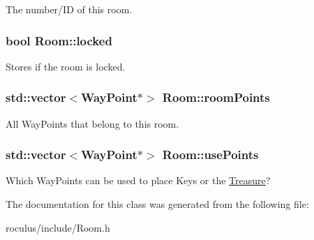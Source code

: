\-The number/\-I\-D of this room. \hypertarget{classRoom_a7d1c69d12f2fe191ad142be4fec461d4}{
\subsubsection[{locked}]{\setlength{\rightskip}{0pt plus 5cm}bool {\bf \-Room\-::locked}}}\label{classRoom_a7d1c69d12f2fe191ad142be4fec461d4}
\-Stores if the room is locked. \hypertarget{classRoom_a672a853c876de647aec33a2ad4da0471}{
\subsubsection[{room\-Points}]{\setlength{\rightskip}{0pt plus 5cm}std\-::vector$<${\bf \-Way\-Point}$\ast$$>$ {\bf \-Room\-::room\-Points}}}\label{classRoom_a672a853c876de647aec33a2ad4da0471}
\-All \-Way\-Points that belong to this room. \hypertarget{classRoom_a56e6a07d53a2514d7538b72f56bcbf45}{
\subsubsection[{use\-Points}]{\setlength{\rightskip}{0pt plus 5cm}std\-::vector$<${\bf \-Way\-Point}$\ast$$>$ {\bf \-Room\-::use\-Points}}}\label{classRoom_a56e6a07d53a2514d7538b72f56bcbf45}
\-Which \-Way\-Points can be used to place \-Keys or the \hyperlink{classTreasure}{\-Treasure}? 

\-The documentation for this class was generated from the following file\-:\begin{DoxyCompactItemize}
\item 
roculus/include/\-Room.\-h\end{DoxyCompactItemize}
